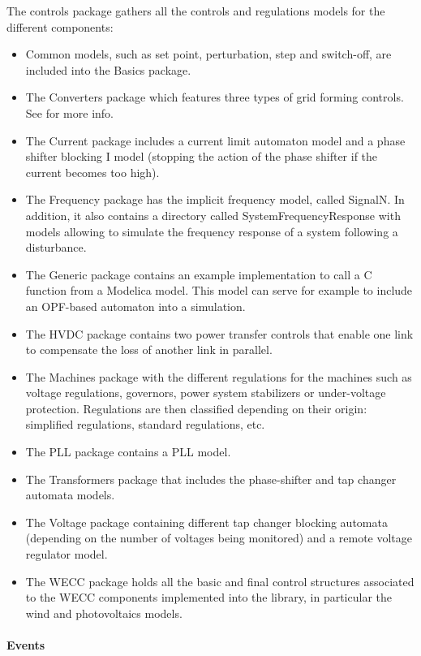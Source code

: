 \documentclass[a4paper, 12pt]{report}
\begin{document}
The controls package gathers all the controls and regulations models for the different components:
\begin{itemize}
\item Common models, such as set point, perturbation, step and switch-off, are included into the Basics package.
\item The Converters package which features three types of grid forming controls. See \cite{GridForming} for more info.
\item The Current package includes a current limit automaton model and a phase shifter blocking I model (stopping the action of the phase shifter if the current becomes too high).
\item The Frequency package has the implicit frequency model, called SignalN. In addition, it also contains a directory called SystemFrequencyResponse with models allowing to simulate the frequency response of a system following a disturbance.
\item The Generic package contains an example implementation to call a C function from a Modelica model. This model can serve for example to include an OPF-based automaton into a \Dynawo simulation.
\item The HVDC package contains two power transfer controls that enable one link to compensate the loss of another link in parallel.
\item The Machines package with the different regulations for the machines such as voltage regulations, governors, power system stabilizers or under-voltage protection. Regulations are then classified depending on their origin: simplified regulations, standard regulations, etc.
\item The \ac{PLL} package contains a \ac{PLL} model.
\item The Transformers package that includes the phase-shifter and tap changer automata models.
\item The Voltage package containing different tap changer blocking automata (depending on the number of voltages being monitored) and a remote voltage regulator model.
\item The \ac{WECC} package holds all the basic and final control structures associated to the \ac{WECC} components implemented into the \Dynawo library, in particular the wind and photovoltaics models.
\end{itemize}

\paragraph{Events}
~~\\
\end{document}

